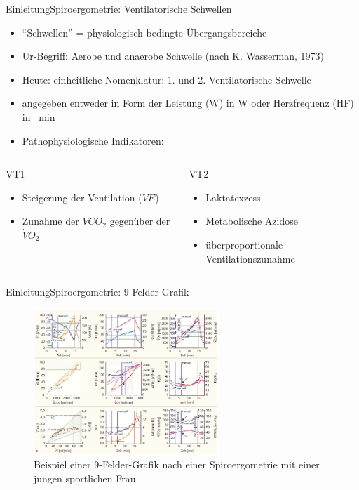 \documentclass[
handout, 
aspectratio=141, 
10pt,
xcolor=dvipsnames]
{beamer}
\begin{document}
\begin{frame}{Einleitung}{Spiroergometrie: Ventilatorische Schwellen}
\begin{itemize}
	\item "`Schwellen"' = physiologisch bedingte Übergangsbereiche
	\item Ur-Begriff: Aerobe und anaerobe Schwelle (nach K. Wasserman, 1973)
	\item Heute: einheitliche Nomenklatur: 1. und 2. Ventilatorische Schwelle
	\item angegeben entweder in Form der Leistung (W) in \si{\watt} oder Herzfrequenz (HF) in \si{\per\minute}
	\item Pathophysiologische Indikatoren:
\end{itemize}
\begin{columns}
	\begin{column}{5cm}
		\begin{block}{VT1}
			\begin{itemize}
				\item Steigerung der Ventilation ($\dot{V}E$)
				\item Zunahme der $\dot{V}CO_2$ gegenüber der $\dot{V}O_2$
			\end{itemize}
		\end{block}
	\end{column}
	\begin{column}{5cm}
		\begin{block}{VT2}
			\begin{itemize}
				\item Laktatexzess
				\item Metabolische Azidose
				\item überproportionale Ventilationszunahme
			\end{itemize}
		\end{block}
\end{column}
\end{columns}
\end{frame}

\begin{frame}{Einleitung}{Spiroergometrie: 9-Felder-Grafik}
	\begin{figure}[H]
		\centering
		\includegraphics[width=7cm]{Bilder/9fieldcomplex.png}
		\caption{Beispiel einer 9-Felder-Grafik nach einer Spiroergometrie mit einer jungen sportlichen Frau}
	\end{figure}
\end{frame}
\end{document}
